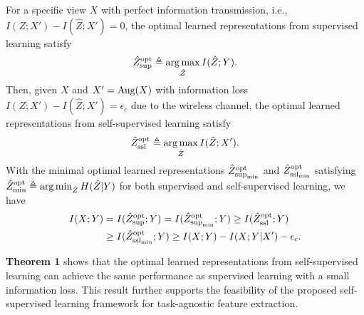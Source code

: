 \begin{theorem} 
    For a specific view \( X \) with perfect information transmission, i.e., \( I(Z;X') - I(\hat{Z};X') = 0 \), the optimal learned representations from supervised learning satisfy 
    \begin{equation} 
    \hat{Z}^{\textnormal{opt}}_{\textnormal{sup}} \triangleq \mathop{\arg\max}_{\hat{Z}} I(\hat{Z};Y). 
    \end{equation} 
    Then, given \( X \) and \( X' = \textnormal{Aug}(X) \) with information loss \( I(Z;X') - I(\hat{Z};X') = \epsilon_c \) due to the wireless channel, the optimal learned representations from self-supervised learning satisfy 
    \begin{equation} 
    \hat{Z}^{\textnormal{opt}}_{\textnormal{ssl}} \triangleq \mathop{\arg\max}_{\hat{Z}} I(\hat{Z};X'). 
    \end{equation} 
    With the minimal optimal learned representations \( \hat{Z}^{\textnormal{opt}}_{\textnormal{sup}_{\textnormal{min}}} \) and \( \hat{Z}^{\textnormal{opt}}_{\textnormal{ssl}_{\textnormal{min}}} \) satisfying \( \hat{Z}^{\textnormal{opt}}_{\textnormal{min}} \triangleq \mathop{\arg\min}_{\hat{Z}} H(\hat{Z}|Y) \) for both supervised and self-supervised learning, we have 
    \begin{equation} 
    \begin{aligned} 
    I(X;Y) &= I(\hat{Z}^{\textnormal{opt}}_{\textnormal{sup}};Y) = I(\hat{Z}^{\textnormal{opt}}_{\textnormal{sup}_{\textnormal{min}}};Y) \geq I(\hat{Z}^{\textnormal{opt}}_{\textnormal{ssl}};Y) \\ 
    &\geq I(\hat{Z}^{\textnormal{opt}}_{\textnormal{ssl}_{\textnormal{min}}};Y) \geq I(X;Y) - I(X;Y|X') - \epsilon_c. 
    \end{aligned} 
    \end{equation} 
\end{theorem}
    
\textbf{Theorem 1} shows that the optimal learned representations from self-supervised learning can achieve the same performance as supervised learning with a small information loss. This result further supports the feasibility of the proposed self-supervised learning framework for task-agnostic feature extraction.

